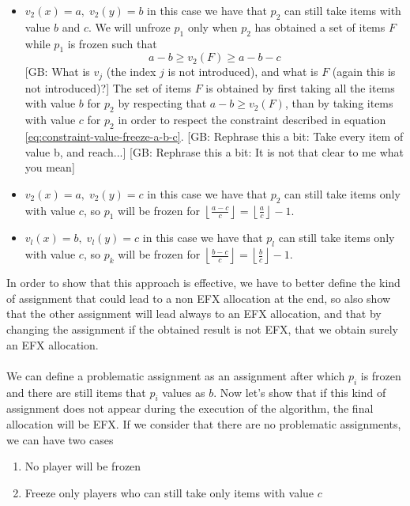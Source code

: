 \documentclass{article}
\newcommand{\gb}[1]{{\color{red}[GB: #1]}}
\begin{document}
\begin{itemize}
    \item $v_2(x) = a,\; v_2(y) =  b$ in this case we have that $p_2$ can still take items with value $b$ and $c$. We will unfroze $p_1$ only when $p_2$ has obtained a set of items $F$ while $p_1$ is frozen such that
    \begin{equation}
        a-b\ge v_2(F)\ge a-b-c
        \label{eq:constraint-value-freeze-a-b-c}
    \end{equation}
    \gb{What is $v_j$ (the index $j$ is not introduced), and what is $F$ (again this is not introduced)?}
    The set of items $F$ is obtained by first taking all the items with value $b$ for $p_2$ by respecting that $a-b\ge v_2(F)$, than by taking items with value $c$ for $p_2$ in order to respect the constraint described in equation \ref{eq:constraint-value-freeze-a-b-c}.
    \gb{Rephrase this a bit: Take every item of value b, and reach...}
    \gb{Rephrase this a bit: It is not that clear to me what you mean}
    \item $v_2(x) = a,\; v_2(y) =  c$ in this case we have that $p_2$ can still take items only with value $c$, so $p_1$ will be frozen for $\left\lfloor \frac{a-c}{c}\right \rfloor =\left \lfloor \frac{a}{c}\right \rfloor - 1$.
    \item $v_l(x) = b,\; v_l(y) =  c$ in this case we have that $p_l$ can still take items only with value $c$, so $p_k$ will be frozen for $\left \lfloor \frac{b-c}{c}\right \rfloor =\left  \lfloor \frac{b}{c}\right \rfloor - 1$.
\end{itemize}
In order to show that this approach is effective, we have to better define the kind of assignment that could lead to a non EFX allocation at the end, so also show that the other assignment will lead always to an EFX allocation, and that by changing the assignment if the obtained result is not EFX, that we obtain surely an EFX allocation.
\paragraph{}
We can define a problematic assignment as an assignment after which $p_i$ is frozen and there are still items that $p_i$ values as $b$. Now let's show that if this kind of assignment does not appear during the execution of the algorithm, the final allocation will be EFX. If we consider that there are no problematic assignments, we can have two cases
\begin{enumerate}
    \item No player will be frozen
    \item Freeze only players who can still take only items with value $c$ 
\end{enumerate}
\end{document}
